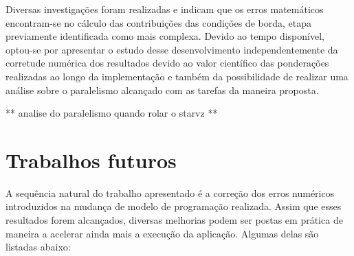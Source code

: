 \documentclass[cic,tc]{iiufrgs}
\begin{document}
Diversas investigações foram realizadas e indicam que os erros matemáticos encontram-se no cálculo das contribuições das condições de borda, etapa previamente
identificada como mais complexa. Devido ao tempo disponível, optou-se por apresentar o estudo desse desenvolvimento independentemente da corretude numérica dos resultados
devido ao valor científico das ponderações realizadas ao longo da implementação e também da possibilidade de realizar uma análise sobre o paralelismo alcançado
com as tarefas da maneira proposta.

** analise do paralelismo quando rolar o starvz **

\section{Trabalhos futuros}

A sequência natural do trabalho apresentado é a correção dos erros numéricos introduzidos na mudança de modelo de programação realizada. Assim que esses resultados
forem alcançados, diversas melhorias podem ser postas em prática de maneira a acelerar ainda mais a execução da aplicação. Algumas delas são listadas abaixo:
\end{document}
